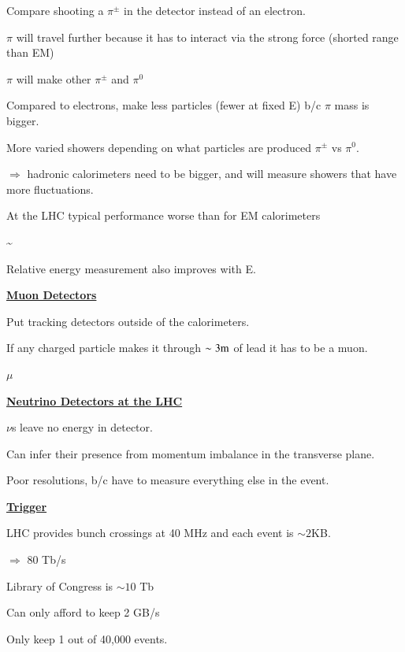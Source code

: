 {Compare shooting a $\pi^\pm$ in the detector instead of an electron.

\bi
\item[-]$\pi$ will travel further because it has to interact via the strong force (shorted range than EM)
\item[-]$\pi$ will make other $\pi^\pm$ and $\pi^0$
\item[-]Compared to electrons, make less particles (fewer at fixed E) b/c $\pi$ mass is bigger.
\item[-]More varied showers depending on what particles are produced $\pi^\pm$ vs $\pi^0$.
\ei

$\Rightarrow$ hadronic calorimeters need to be bigger, and will measure showers that have more fluctuations.

At the LHC typical performance worse than for EM calorimeters

\be
{} \sim  {}
\ee

Relative energy measurement also improves with E.


\textbf{\underline{Muon Detectors}}

Put tracking detectors outside of the calorimeters. 

If any charged particle makes it through $\sim3\textrm{m}$ of lead it has to be a muon. 

$\mu$ 

\textbf{\underline{Neutrino Detectors at the LHC}}

$\nu$s leave no energy in detector.  

Can infer their presence from momentum imbalance in the transverse plane.

Poor resolutions, b/c have to measure everything else in the event.

\textbf{\underline{Trigger}}

LHC provides bunch crossings at 40 MHz and each event is $\sim 2$KB.

 $\Rightarrow $ 80 Tb/s 

Library of Congress is $\sim 10$ Tb

Can only afford to keep 2 GB/s

Only keep 1 out of 40,000 events.


}



